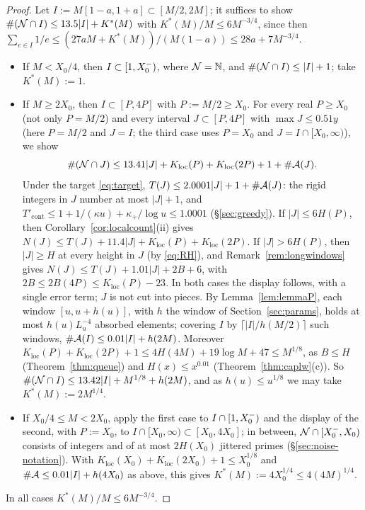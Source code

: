 \begin{proof}
Let $I:=M[1-a,1+a]\subset[M/2,2M]$; it suffices to show $\#(\mathcal{N}\cap I)\le13.5|I|+K^*(M)$ with $K^*(M)/M\le6M^{-3/4}$,
since then $\sum_{e\in I}1/e\le(27aM+K^*(M))/(M(1-a))\le28a+7M^{-3/4}$.
\begin{itemize}
\item If $M<X_0/4$, then $I\subset[1,X_0^{-})$, where $\mathcal{N}=\mathbb{N}$, and $\#(\mathcal{N}\cap I)\le|I|+1$; take $K^*(M):=1$.
\item If $M\ge2X_0$, then $I\subset[P,4P]$ with $P:=M/2\ge X_0$.
  For every real $P\ge X_0$ (not only $P=M/2$) and every interval $J\subset[P,4P]$ with $\max J\le0.51y$ (here $P=M/2$ and $J=I$; the third case uses $P=X_0$ and $J=I\cap[X_0,\infty)$), we show
  \[
    \#(\mathcal{N}\cap J)\le13.41|J|+K_{\mathrm{loc}}(P)+K_{\mathrm{loc}}(2P)+1+\#\mathcal{A}(J).
  \]
  Under the target \eqref{eq:target}, $T(J)\le2.0001|J|+1+\#\mathcal{A}(J)$: the rigid integers in $J$ number at most $|J|+1$, and
  $T'_{\mathrm{cont}}\le1+1/(\kappa u)+\kappa_+/\log u\le1.0001$ (\S\ref{sec:greedy}). If $|J|\le6H(P)$, then
  Corollary~\ref{cor:localcount}(ii) gives $N(J)\le T(J)+11.4|J|+K_{\mathrm{loc}}(P)+K_{\mathrm{loc}}(2P)$. If $|J|>6H(P)$, then
  $|J|\ge H$ at every height in $J$ (by \eqref{eq:RH}), and Remark~\ref{rem:longwindows} gives
  $N(J)\le T(J)+1.01|J|+2B+6$, with $2B\le2B(4P)\le K_{\mathrm{loc}}(P)-23$. In both cases the display follows, with a single
  error term; $J$ is not cut into pieces. By Lemma~\ref{lem:lemmaP}, each window $[u,u+h(u)]$, with $h$ the window of Section~\ref{sec:params}, holds at most $h(u)L_u^{-4}$
  absorbed elements; covering $I$ by $\lceil|I|/h(M/2)\rceil$ such windows, $\#\mathcal{A}(I)\le0.01|I|+h(2M)$. Moreover
  $K_{\mathrm{loc}}(P)+K_{\mathrm{loc}}(2P)+1\le4H(4M)+19\log M+47\le M^{1/8}$, as $B\le H$ (Theorem~\ref{thm:queue}) and
  $H(x)\le x^{0.01}$ (Theorem~\ref{thm:caplw}(c)). So $\#(\mathcal{N}\cap I)\le13.42|I|+M^{1/8}+h(2M)$, and as $h(u)\le u^{1/8}$
  we may take $K^*(M):=2M^{1/4}$.
\item If $X_0/4\le M<2X_0$, apply the first case to $I\cap[1,X_0^{-})$ and the display of the second, with $P:=X_0$, to
  $I\cap[X_0,\infty)\subset[X_0,4X_0]$; in between,
  $\mathcal{N}\cap[X_0^{-},X_0)$ consists of integers and of at most $2H(X_0)$ jittered primes (\S\ref{sec:noise-notation}). With
  $K_{\mathrm{loc}}(X_0)+K_{\mathrm{loc}}(2X_0)+1\le X_0^{1/8}$ and $\#\mathcal{A}\le0.01|I|+h(4X_0)$ as above, this gives
  $K^*(M):=4X_0^{1/4}\le4(4M)^{1/4}$.
\end{itemize}
In all cases $K^*(M)/M\le6M^{-3/4}$.
\end{proof}

